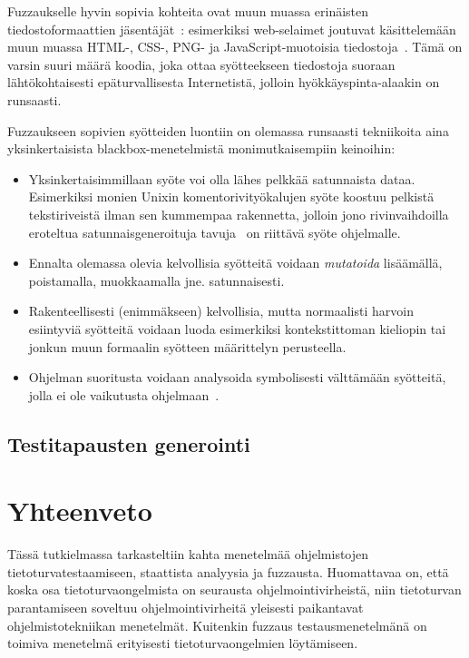 Fuzzaukselle hyvin sopivia kohteita ovat muun muassa erinäisten tiedostoformaattien jäsentäjät~\cite{SageArtikkeli,OuluBrowser}:
esimerkiksi web-selaimet joutuvat käsittelemään muun muassa
HTML-, CSS-, PNG- ja JavaScript-muotoisia tiedostoja~\cite{OuluBrowser}.
Tämä on varsin suuri määrä koodia,
joka ottaa syötteekseen tiedostoja suoraan lähtökohtaisesti epäturvallisesta Internetistä,
jolloin hyökkäyspinta-alaakin on runsaasti.

Fuzzaukseen sopivien syötteiden luontiin on olemassa runsaasti tekniikoita aina yksinkertaisista blackbox-menetelmistä monimutkaisempiin keinoihin:
\begin{itemize}
    \item Yksinkertaisimmillaan syöte voi olla lähes pelkkää satunnaista dataa.
          Esimerkiksi monien Unixin komentorivityökalujen syöte koostuu pelkistä tekstiriveistä
          ilman sen kummempaa rakennetta,
          jolloin jono rivinvaihdoilla eroteltua satunnaisgeneroituja
          tavuja~\cite{UnixReliability} on riittävä syöte ohjelmalle.
    \item Ennalta olemassa olevia kelvollisia syötteitä voidaan \emph{mutatoida} lisäämällä, poistamalla, muokkaamalla jne. satunnaisesti.
    \item Rakenteellisesti (enimmäkseen) kelvollisia, mutta normaalisti harvoin esiintyviä syötteitä voidaan luoda esimerkiksi kontekstittoman kieliopin tai jonkun muun formaalin syötteen määrittelyn perusteella.
    \item Ohjelman suoritusta voidaan analysoida symbolisesti välttämään syötteitä, jolla ei ole vaikutusta ohjelmaan~\cite{SageArtikkeli}.
\end{itemize}

\subsection{Testitapausten generointi}

\section{Yhteenveto}
Tässä tutkielmassa tarkasteltiin kahta menetelmää ohjelmistojen tietoturvatestaamiseen,
staattista analyysia ja fuzzausta.
Huomattavaa on, että koska osa tietoturvaongelmista on seurausta ohjelmointivirheistä,
niin tietoturvan parantamiseen soveltuu ohjelmointivirheitä yleisesti paikantavat ohjelmistotekniikan menetelmät.
Kuitenkin fuzzaus testausmenetelmänä on toimiva menetelmä erityisesti tietoturvaongelmien löytämiseen.
